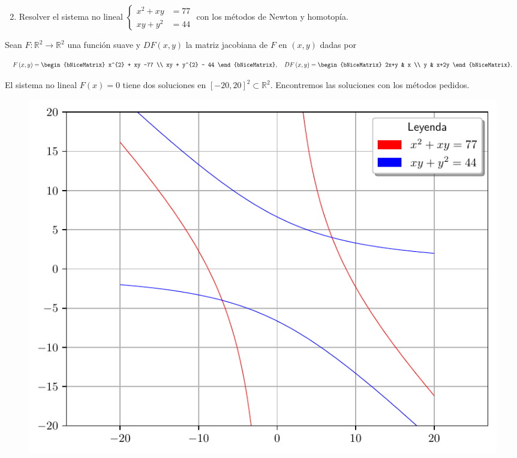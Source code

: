 \begin{frame}
	\begin{enumerate}\setcounter{enumi}{1}
		\item

		      Resolver el sistema no lineal
		      \begin{math}
			      \left\{
			      \begin{aligned}
				      x^{2} + xy  & = 77 \\
				      xy  + y^{2} & = 44
			      \end{aligned}
			      \right.
		      \end{math}
		      con los métodos de Newton y
		      homotopía.
	\end{enumerate}

	\begin{solution}
		Sean $F\colon\mathbb{R}^{2}\to\mathbb{R}^{2}$ una función suave y
		$DF\left(x,y\right)$ la matriz jacobiana de $F$ en
		$\left(x,y\right)$ dadas por

		\begin{equation*}
			F\left(x,y\right)=
			\begin{bNiceMatrix}
				x^{2} + xy -77 \\
				xy  + y^{2} - 44
			\end{bNiceMatrix},\quad
			DF\left(x,y\right)=
			\begin{bNiceMatrix}
				2x+y & x    \\
				y    & x+2y
			\end{bNiceMatrix}.
		\end{equation*}

		El sistema no lineal $F\left(x\right)=0$ tiene dos soluciones en
		${\left[-20,20\right]}^{2}\subset\mathbb{R}^{2}$.
		Encontremos las soluciones con los métodos pedidos.

		\begin{figure}[ht!]
			\centering
			\includegraphics[width=0.45\paperwidth]{p2_plot}
		\end{figure}
	\end{solution}
\end{frame}

